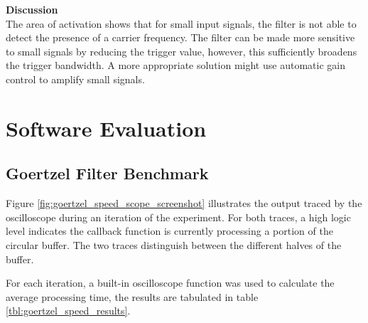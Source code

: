 \textbf{Discussion}\\
The area of activation shows that for small input signals, the filter is not able to detect the presence of a carrier frequency. The filter can be made more sensitive to small signals by reducing the trigger value, however, this sufficiently broadens the trigger bandwidth. A more appropriate solution might use automatic gain control to amplify small signals.








\section{Software Evaluation}


\subsection{Goertzel Filter Benchmark}

Figure \ref{fig:goertzel_speed_scope_screenshot} illustrates the output traced by the oscilloscope during an iteration of the experiment. For both traces, a high logic level indicates the callback function is currently processing a portion of the circular buffer. The two traces distinguish between the different halves of the buffer.

For each iteration, a built-in oscilloscope function was used to calculate the average processing time, the results are tabulated in table \ref{tbl:goertzel_speed_results}.

